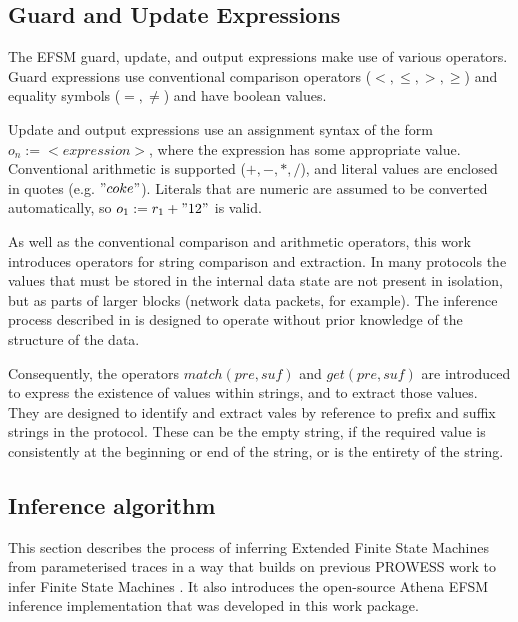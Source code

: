 \subsection{Guard and Update Expressions}
\label{Expressions}

The EFSM guard, update, and output expressions make use of various operators. Guard expressions use conventional comparison operators ($<, \leq, >, \geq$) and equality symbols ($=, \neq$) and have boolean values.

Update and output expressions use an assignment syntax of the form $o_n := <expression>$, where the expression has some appropriate value. Conventional arithmetic is supported ($+,-,*,/$), and literal values are enclosed in quotes (e.g. $"coke"$). Literals that are numeric are assumed to be converted automatically, so $o_1 := r_1 + "12"$ is valid. 

As well as the conventional comparison and arithmetic operators, this work introduces operators for string comparison and extraction. In many protocols the values that must be stored in the internal data state are not present in isolation, but as parts of larger blocks (network data packets, for example). The inference process described in  is designed to operate without prior knowledge of the structure of the data. 

Consequently, the operators $match(pre,suf)$ and $get(pre,suf)$ are introduced to express the existence of values within strings, and to extract those values. They are designed to identify and extract vales by reference to prefix and suffix strings in the protocol. These can be the empty string, if the required value is consistently at the beginning or end of the string, or is the entirety of the string. 




\subsection{Inference algorithm}
\label{Algorithm}

This section describes the process of inferring Extended Finite State Machines from parameterised traces in a way that builds on previous PROWESS work to infer Finite State Machines \cite{}. It also introduces the open-source Athena \cite{Athena} EFSM inference implementation that was developed in this work package.


